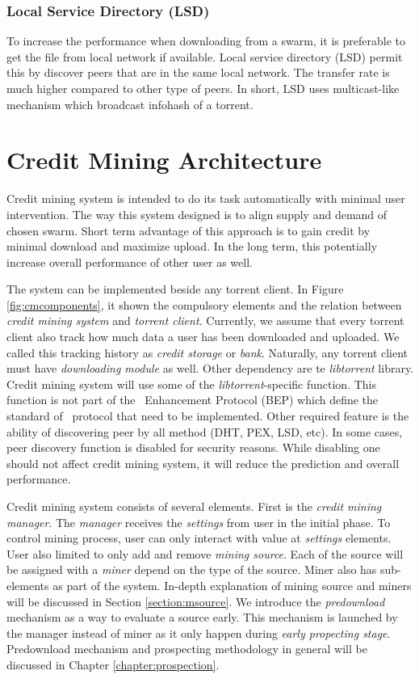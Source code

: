 \subsubsection{Local Service Directory (LSD)}
To increase the performance when downloading from a swarm, it is preferable to get the file from local network if available. Local service directory (LSD) permit this by discover peers that are in the same local network. The transfer rate is much higher compared to other type of peers. In short, LSD uses multicast-like mechanism which broadcast infohash of a torrent.


\section{Credit Mining Architecture}
\label{section:cmcomponents}

Credit mining system is intended to do its task automatically with minimal user intervention. The way this system designed is to align supply and demand of chosen swarm. Short term advantage of this approach is to gain credit by minimal download and maximize upload. In the long term, this potentially increase overall performance of other user as well.

The system can be implemented beside any torrent client. In Figure \ref{fig:cmcomponents}, it shown the compulsory elements and the relation between \textit{credit mining system} and \textit{torrent client}. Currently, we assume that every torrent client also track how much data a user has been downloaded and uploaded. We called this tracking history as \textit{credit storage} or \textit{bank}. Naturally, any torrent client must have \textit{downloading module} as well. Other dependency are te \textit{libtorrent} library. Credit mining system will use some of the \textit{libtorrent}-specific function. This function is not part of the \bt~Enhancement Protocol (BEP) which define the standard of \bt~protocol that need to be implemented. Other required feature is the ability of discovering peer by all method (DHT, PEX, LSD, etc). In some cases, peer discovery function is disabled for security reasons. While disabling one should not affect credit mining system, it will reduce the prediction and overall performance.

Credit mining system consists of several elements. First is the \textit{credit mining manager}. The \textit{manager} receives the \textit{settings} from user in the initial phase. To control mining process, user can only interact with value at \textit{settings} elements. User also limited to only add and remove \textit{mining source}. Each of the source will be assigned with a \textit{miner} depend on the type of the source. Miner also has sub-elements as part of the system. In-depth explanation of mining source and miners will be discussed in Section \ref{section:msource}. We introduce the \textit{predownload} mechanism as a way to evaluate a source early. This mechanism is launched by the manager instead of miner as it only happen during \textit{early propecting stage}. Predownload mechanism and prospecting methodology in general will be discussed in Chapter \ref{chapter:prospection}.

